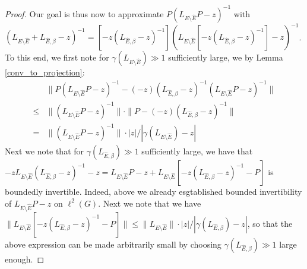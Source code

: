\documentclass[reqno,12pt,letterpaper]{amsart}
\numberwithin{equation}{section}
\newcommand{\1}{\mathds{1}}
\theoremstyle{definition}
\begin{document}
\begin{proof}
Our goal is thus now to approximate $P(L_{E \setminus \hat{E}} P -z)^{-1} $ with $( L_{E \setminus \hat{E}} + L_{\hat{E},\beta} -z)^{-1} = [-z(L_{\hat{E},\beta} -z)^{-1}](L_{E \setminus \hat{E}}[-z(L_{\hat{E},\beta} -z)^{-1}] -z)^{-1} $. To this end, we first note for $\gamma(L_{E \setminus \hat{E}})  \gg 1$ sufficiently large, we by Lemma \ref{conv_to_projection}:
\begin{align}
	&\| P (L_{E \setminus \hat{E}} P -z)^{-1} - (-z)(L_{\hat{E},\beta} - z)^{-1} (L_{E \setminus \hat{E}} P -z)^{-1}   \|\\
	\leq& \| (L_{E \setminus \hat{E}} P - z)^{-1}\| 
	\cdot
	\| P - (-z)(L_{\hat{E},\beta} - z)^{-1}  \| \\
	=&  \| (L_{E \setminus \hat{E}} P - z)^{-1}\| 
	\cdot |z|/|\gamma(L_{E \setminus \hat{E}}) - z|
\end{align}
Next we note that for $\gamma(L_{\hat{E},\beta}) \gg 1$ sufficiently large, we have that $-z L_{E \setminus \hat{E}} (L_{\hat{E},\beta} -z)^{-1} - z = L_{E \setminus \hat{E}} P -z + L_{E \setminus \hat{E}} [-z (L_{\hat{E},\beta} -z)^{-1}- P]$ is boundedly invertible.
Indeed, above we already esgtablished bounded invertibility of $L_{E \setminus \hat{E}} P -z $ on $\ell^2(G)$. Next we note that we have 
$
	\|L_{E \setminus \hat{E}} [-z (L_{\hat{E},\beta} -z)^{-1}- P]\| \leq \|L_{E \setminus \hat{E}} \| \cdot |z|/|\gamma(L_{\hat{E},\beta})-z|
$,
so that the above expression can be made arbitrarily small by choosing $\gamma(L_{\hat{E},\beta}) \gg 1$ large enough. 


\end{proof}
\end{document}
